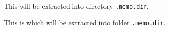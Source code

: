 \documentclass{article}
\begin{document}
This  will be extracted into directory
\texttt{\string\jobname.memo.dir}.

This is  which will be extracted into folder
\texttt{\string\jobname.memo.dir}.
\end{document}
